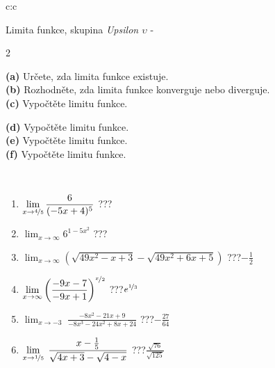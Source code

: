 \documentclass[10pt]{report}
\begin{document}
\begin{tabular}{c:c}
\begin{minipage}[c][104.5mm][t]{0.5\linewidth}
\begin{center}
\vspace{7mm}
{\huge Limita funkce, skupina \textit{Upsilon $\upsilon$} -}\\[5mm]
\begin{minipage}{0.95\linewidth}
\begin{center}
{\small \begin{multicols}{2} \raggedright
\textbf{(a)} Určete, zda limita funkce existuje. \\[1mm]
\textbf{(b)} Rozhodněte, zda limita funkce konverguje nebo diverguje. \\[1mm]
\textbf{(c)} Vypočtěte limitu funkce. \par \columnbreak
\textbf{(d)} Vypočtěte limitu funkce. \\[1mm]
\textbf{(e)} Vypočtěte limitu funkce. \\[1mm]
\textbf{(f)} Vypočtěte limitu funkce. \\[1mm]
\end{multicols}
}
\end{center}
\end{minipage}
\\[4mm]
\begin{minipage}{0.79\linewidth}
\begin{center}
\begin{varwidth}{\linewidth}
\begin{enumerate}
\normalsize
\item $\displaystyle\lim_{x\to\nicefrac{4}{5}}{\frac{6}{(-5x+4)^{5}}}$\quad \dotfill\; ???\;\dotfill \quad {}
\item $\displaystyle\lim_{x\to\infty}{6^{1-5x^2}}$\quad \dotfill\; ???\;\dotfill \quad {}
\item $\displaystyle\lim_{x\to\infty}{\left(\sqrt{49x^2-x+3} - \sqrt{49x^2+6x+5}\right)}$\quad \dotfill\; ???\;\dotfill \quad $-\frac{1}{2}$
\item $\displaystyle\lim_{x\to\infty}{\left( \frac{-9x-7}{-9x+1} \right)^{\nicefrac{x}{2}}}$\quad \dotfill\; ???\;\dotfill \quad $e^{\nicefrac{1}{3}}$
\item $\displaystyle\lim_{x\to -3}{\;\frac{-8x^2-21x+9}{-8x^3-24x^2+8x+24}}$\quad \dotfill\; ???\;\dotfill \quad $-\frac{27}{64}$
\item $\displaystyle\lim_{x\to \nicefrac{1}{5}}{\;\frac{x-\frac{1}{5}}{\sqrt{4x+3} - \sqrt{4-x}}}$\quad \dotfill\; ???\;\dotfill \quad $\frac{\sqrt{76}}{\sqrt{125}}$

\end{enumerate}
\end{varwidth}
\end{center}
\end{minipage}
\end{center}
\end{minipage}
\end{tabular}
\end{document}
